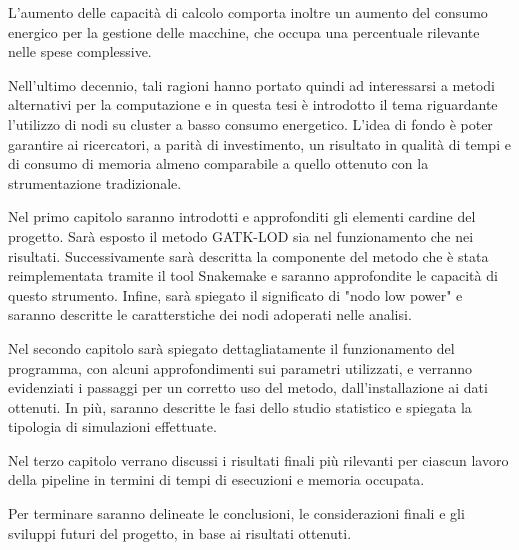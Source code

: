 \documentclass[12pt, a4paper]{report}
\begin{document}
L'aumento delle capacità di calcolo comporta inoltre un aumento del consumo energico per la gestione delle macchine, che occupa una percentuale rilevante nelle spese complessive.

Nell'ultimo decennio, tali ragioni hanno portato quindi ad interessarsi a metodi alternativi per la computazione e in questa tesi è introdotto il tema riguardante l'utilizzo di nodi su cluster a basso consumo energetico.
L'idea di fondo è poter garantire ai ricercatori, a parità di investimento, un risultato in qualità di tempi e di consumo di memoria almeno comparabile a quello ottenuto con la strumentazione tradizionale.

Nel primo capitolo saranno introdotti e approfonditi gli elementi cardine del progetto. Sarà esposto il metodo GATK-LOD sia nel funzionamento che nei risultati. 
Successivamente sarà descritta la componente del metodo che è stata reimplementata tramite il tool Snakemake e saranno approfondite le capacità di questo strumento.
Infine, sarà spiegato il significato di "nodo low power" e saranno descritte le caratterstiche dei nodi adoperati nelle analisi.

Nel secondo capitolo sarà spiegato dettagliatamente il funzionamento del programma, con alcuni approfondimenti sui parametri utilizzati, e verranno evidenziati i passaggi per un corretto uso del metodo, dall'installazione ai dati ottenuti.
In più, saranno descritte le fasi dello studio statistico e spiegata la tipologia di simulazioni effettuate.

Nel terzo capitolo verrano discussi i risultati finali più rilevanti per ciascun lavoro della pipeline in termini di tempi di esecuzioni e memoria occupata. 

Per terminare saranno delineate le conclusioni, le considerazioni finali e gli sviluppi futuri del progetto, in base ai risultati ottenuti.

\tableofcontents







\end{document}

